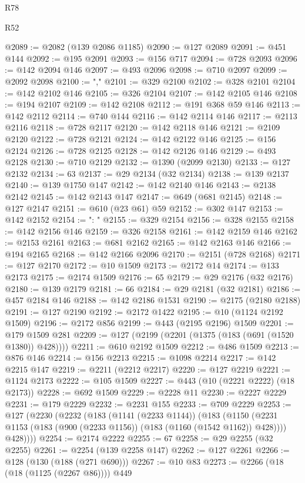 \begin{lexlean}{R78}
\begin{lexlean}{R52}
\begin{coremodule}
{{{{{{{{{{{{{{{{{{{{{{{{{{{{{{{{{{{{{{{{{{{{{{{{{{{{{{{{{{{{{{{{{{{{{{{{{{{{{{{{{{{{{{{{{{{{{{{{{{{{{{{{{{{{{{{{{{{{{{{{{{{{{{{{{{{{{{{{{{{{{{{{{{{{{{{{{{{{{{{{{{{{{{{{{{{{{{{{{{{{{{{{{{{{{{{{{{{{{{@2089 := @2082 (@139 @2086 @1185)
@2090 := @127 @2089
@2091 := @451 @144
@2092 := @195 @2091
@2093 := @156 @717
@2094 := @728 @2093
@2096 := @142 @2094 @146
@2097 := @493 @2096
@2098 := @710 @2097
@2099 := @2092 @2098
@2100 := ","
@2101 := @329 @2100
@2102 := @328 @2101
@2104 := @142 @2102 @146
@2105 := @326 @2104
@2107 := @142 @2105 @146
@2108 := @194 @2107
@2109 := @142 @2108
@2112 := @191 @368 @59 @146
@2113 := @142 @2112
@2114 := @740 @144
@2116 := @142 @2114 @146
@2117 := @2113 @2116
@2118 := @728 @2117
@2120 := @142 @2118 @146
@2121 := @2109 @2120
@2122 := @728 @2121
@2124 := @142 @2122 @146
@2125 := @156 @2124
@2126 := @728 @2125
@2128 := @142 @2126 @146
@2129 := @493 @2128
@2130 := @710 @2129
@2132 := @1390 (@2099 @2130)
@2133 := @127 @2132
@2134 := 63
@2137 := @29 @2134 (@32 @2134)
@2138 := @139 @2137
@2140 := @139 @1750 @147
@2142 := @142 @2140 @146
@2143 := @2138 @2142
@2145 := @142 @2143 @147
@2147 := @649 (@681 @2145)
@2148 := @127 @2147
@2151 := @610 (@23 @61) @59
@2152 := @302 @147
@2153 := @142 @2152
@2154 := ": "
@2155 := @329 @2154
@2156 := @328 @2155
@2158 := @142 @2156 @146
@2159 := @326 @2158
@2161 := @142 @2159 @146
@2162 := @2153 @2161
@2163 := @681 @2162
@2165 := @142 @2163 @146
@2166 := @194 @2165
@2168 := @142 @2166 @2096
@2170 := @2151 (@728 @2168)
@2171 := @127 @2170
@2172 := @10 @1509
@2173 := @2172 @14
@2174 := @133 @2173
@2175 := @2174 @1509
@2176 := 65
@2179 := @29 @2176 (@32 @2176)
@2180 := @139 @2179
@2181 := 66
@2184 := @29 @2181 (@32 @2181)
@2186 := @457 @2184 @146
@2188 := @142 @2186 @1531
@2190 := @2175 (@2180 @2188)
@2191 := @127 @2190
@2192 := @2172 @1422
@2195 := @10 (@1124 @2192 @1509)
@2196 := @2172 @856
@2199 := @443 (@2195 @2196) @1509
@2201 := @179 @1509 @281
@2209 := @127 (@2199 (@2201 (@1375 (@183 (@691 (@1520 @1380)) @428))))
@2211 := @610 @2192 @1509
@2212 := @486 @1509
@2213 := @876 @146
@2214 := @156 @2213
@2215 := @1098 @2214
@2217 := @142 @2215 @147
@2219 := @2211 (@2212 @2217)
@2220 := @127 @2219
@2221 := @1124 @2173
@2222 := @105 @1509
@2227 := @443 (@10 (@2221 @2222) (@18 @2173))
@2228 := @692 @1509
@2229 := @2228 @11
@2230 := @2227 @2229
@2231 := @179 @2229
@2232 := @2231 @155
@2233 := @709 @2229
@2253 := @127
    (@2230
      (@2232
        (@183
          (@1141 (@2233 @1144))
          (@183
            (@1150 (@2231 @1153 (@183 (@900 (@2233 @1156)) (@183 (@1160 (@1542 @1162)) @428))))
            @428))))
@2254 := @2174 @2222
@2255 := 67
@2258 := @29 @2255 (@32 @2255)
@2261 := @2254 (@139 @2258 @147)
@2262 := @127 @2261
@2266 := @128 (@130 (@188 (@271 @690)))
@2267 := @10 @83
@2273 := @2266 (@18 (@18 (@1125 (@2267 @86)))) @449
}}}}}}}}}}}}}}}}}}}}}}}}}}}}}}}}}}}}}}}}}}}}}}}}}}}}}}}}}}}}}}}}}}}}}}}}}}}}}}}}}}}}}}}}}}}}}}}}}}}}}}}}}}}}}}}}}}}}}}}}}}}}}}}}}}}}}}}}}}}}}}}}}}}}}}}}}}}}}}}}}}}}}}}}}}}}}}}}}}}}}}}}}}}}}}}}}}}}}}
\end{coremodule}
\end{lexlean}
\end{lexlean}
